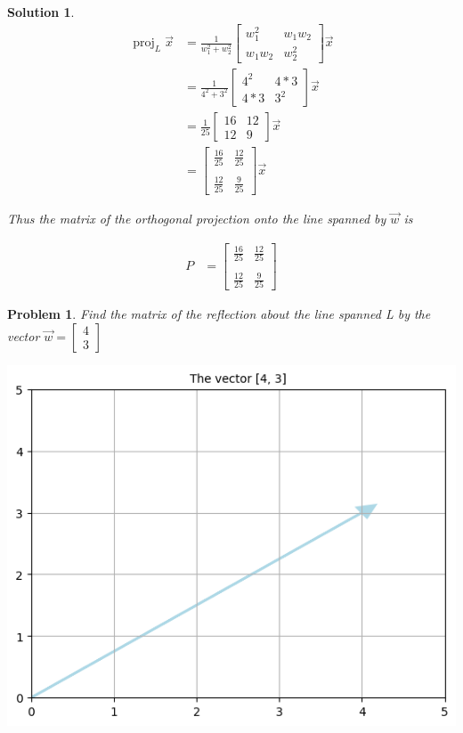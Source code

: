 \documentclass{article}
\newtheorem{problem}{Problem}
\newtheorem*{solution}{Solution}
\DeclareMathOperator{\proj}{proj}
\newcommand{\vectorproj}[2][]{\proj_{#1}#2}
\begin{document}
\begin{solution}
\begin{align*}
\vectorproj[L]{\vec{x}} &= \frac{1}{w_{1}^2 + w_{2}^2} \begin{bmatrix} w_{1}^2 & w_{1}w_{2} \\ w_{1}w_{2} & w_{2}^2\end{bmatrix} \vec{x} \\
&= \frac{1}{4^2 + 3^2} \begin{bmatrix} 4^2 & 4*3 \\ 4*3 & 3^2\end{bmatrix} \vec{x} \\
&= \frac{1}{25} \begin{bmatrix} 16 & 12 \\ 12 & 9\end{bmatrix} \vec{x} \\
&= \begin{bmatrix} \frac{16}{25} & \frac{12}{25} \\ \\ \frac{12}{25} & \frac{9}{25}\end{bmatrix} \vec{x} 
\end{align*}

Thus the matrix of the orthogonal projection onto the line spanned by $\vec{w}$ is

\begin{align*}
P &= \begin{bmatrix} \frac{16}{25} & \frac{12}{25} \\ \\ \frac{12}{25} & \frac{9}{25}\end{bmatrix}
\end{align*}
\end{solution}

\begin{problem}
Find the matrix of the reflection about the line spanned L by the vector $\vec{w} = \begin{bmatrix} 4 \\ 3 \end{bmatrix}$

\includegraphics[scale=0.5, center]{vector43} 
\end{problem}
\end{document}
